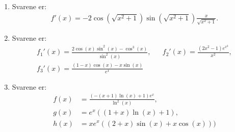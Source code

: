 \begin{enumerate}
	\item Svarene er:
	\begin{align*}
	f'(x)=-2\cos(\sqrt{x^2+1})\sin(\sqrt{x^2+1})\frac{x}{\sqrt{x^2+1}}.
	\end{align*}
		
	\item Svarene er:
	\begin{align*}
	f_1'(x)=\frac{2\cos(x)\sin^2(x)-\cos^3(x)}{\sin^2(x)},&&f_2'(x)=\frac{(2x^2-1)e^{x^2}}{x^2},\\f_3'(x)= \frac{(1-x)\cos(x)-x\sin(x)}{e^{x}}
	\end{align*}
	
	
	
	\item Svarene er:
	\begin{align*}
	f(x)&=\frac{(-(x+1)\ln(x)+1)e^x}{\ln^2(x)},\\ g(x)&=e^x((1+x)\ln (x)+1),\\ h(x)&=xe^x((2+x)\sin(x)+x\cos(x)) )
	\end{align*}
	
	
\end{enumerate}